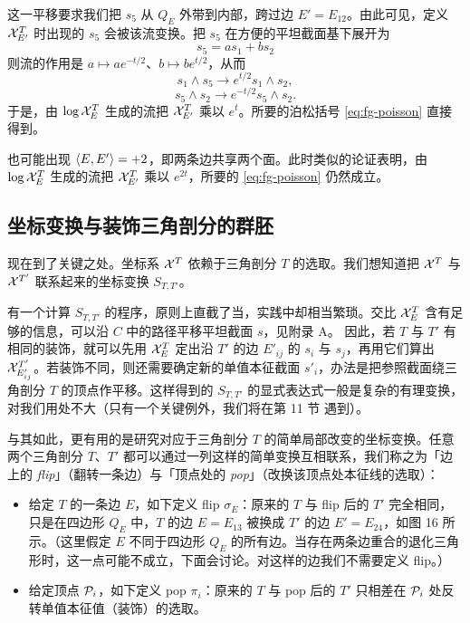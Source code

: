 
这一平移要求我们把 $s_5$ 从 $Q_E$ 外带到内部，跨过边 $E'=E_{12}$。由此可见，定义 $\mathcal{X}^T_{E'}$ 时出现的 $s_5$ 会被该流变换。把 $s_5$ 在方便的平坦截面基下展开为
\begin{equation}
s_5 = a s_1 + b s_2
\end{equation}
则流的作用是 $a\mapsto ae^{-t/2}$、$b\mapsto be^{t/2}$，从而
\begin{equation}
s_1\wedge s_5 \to e^{t/2} s_1\wedge s_2,
\end{equation}
\begin{equation}
s_5\wedge s_2 \to e^{-t/2} s_5\wedge s_2.
\end{equation}
于是，由 $\log\mathcal{X}^T_E$ 生成的流把 $\mathcal{X}^T_{E'}$ 乘以 $e^{t}$。所要的泊松括号 \eqref{eq:fg-poisson} 直接得到。

也可能出现 $\langle E,E' \rangle=+2$，即两条边共享两个面。此时类似的论证表明，由 $\log\mathcal{X}^T_E$ 生成的流把 $\mathcal{X}^T_{E'}$ 乘以 $e^{2t}$，所要的 \eqref{eq:fg-poisson} 仍然成立。

\subsection{坐标变换与装饰三角剖分的群胚}

现在到了关键之处。坐标系 $\mathcal{X}^T$ 依赖于三角剖分 $T$ 的选取。我们想知道把 $\mathcal{X}^T$ 与 $\mathcal{X}^{T'}$ 联系起来的坐标变换 $S_{T,T'}$。

有一个计算 $S_{T,T'}$ 的程序，原则上直截了当，实践中却相当繁琐。交比 $\mathcal{X}^T_E$ 含有足够的信息，可以沿 $C$ 中的路径平移平坦截面 $s$，见附录 A。%
因此，若 $T$ 与 $T'$ 有相同的装饰，就可以先用 $\mathcal{X}^T_E$ 定出沿 $T'$ 的边 $E'_{ij}$ 的 $s_i$ 与 $s_j$，再用它们算出 $\mathcal{X}^{T'}_{E'_{ij}}$。若装饰不同，则还需要确定新的单值本征截面 $s'_i$，办法是把参照截面绕三角剖分 $T$ 的顶点作平移。这样得到的 $S_{T,T'}$ 的显式表达式一般是复杂的有理变换，对我们用处不大（只有一个关键例外，我们将在第 11 节%
遇到）。

与其如此，更有用的是研究对应于三角剖分 $T$ 的简单局部改变的坐标变换。任意两个三角剖分 $T$、$T'$ 都可以通过一列这样的简单变换互相联系，我们称之为「边上的 \emph{flip}」（翻转一条边）与「顶点处的 \emph{pop}」（改换该顶点处本征线的选取）：

\begin{itemize}
\item 给定 $T$ 的一条边 $E$，如下定义 flip $\sigma_E$：原来的 $T$ 与 flip 后的 $T'$ 完全相同，只是在四边形 $Q_E$ 中，$T$ 的边 $E=E_{13}$ 被换成 $T'$ 的边 $E'=E_{24}$，如图 16%
所示。（这里假定 $E$ 不同于四边形 $Q_E$ 的所有边。当存在两条边重合的退化三角形时，这一点可能不成立，下面会讨论。对这样的边我们不需要定义 flip。）

\item 给定顶点 $\mathcal{P}_i$，如下定义 pop $\pi_i$：原来的 $T$ 与 pop 后的 $T'$ 只相差在 $\mathcal{P}_i$ 处反转单值本征值（装饰）的选取。
\end{itemize}

